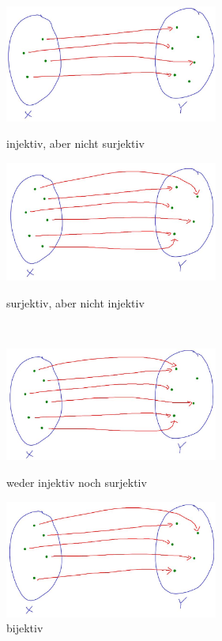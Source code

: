 \begin{figure}[ht]
    \begin{minipage}{.48\textwidth}
        \includegraphics[width=7cm]{./_img/injsur4.jpeg}
        \centering \caption{injektiv, aber nicht surjektiv}
    \end{minipage}
    \quad
    \begin{minipage}{.48\textwidth}
        \includegraphics[width=7cm]{./_img/injsur2.jpeg}
        \centering \caption{surjektiv, aber nicht injektiv}
    \end{minipage}
    \quad\\[1em]
    \begin{minipage}{.48\textwidth}
        \includegraphics[width=7cm]{./_img/injsur1.jpeg}
        \centering \caption{weder injektiv noch surjektiv}
    \end{minipage}
    \quad
    \begin{minipage}{.48\textwidth}
        \includegraphics[width=7cm]{./_img/injsur3.jpeg}
        \centering \caption{bijektiv}
    \end{minipage}
\end{figure}


